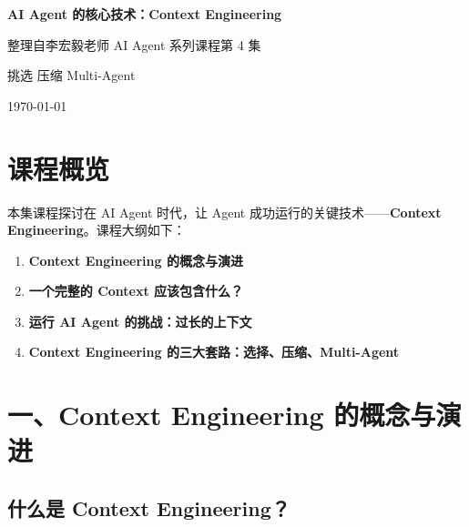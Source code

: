\documentclass[12pt,a4paper]{article}
\begin{document}
\begin{titlepage}
  \centering
  \vspace*{3cm}
  {\Huge\bfseries\sffamily AI Agent 的核心技术：Context Engineering\par}
  \vspace{1.5cm}
  {\Large 整理自李宏毅老师 AI Agent 系列课程第 4 集\par}
  \vspace{2cm}
  {\large\sffamily 挑选 \textbullet{} 压缩 \textbullet{} Multi-Agent\par}
  \vfill
  {\large \today\par}
\end{titlepage}

\newpage
\tableofcontents
\newpage

\section{课程概览}

本集课程探讨在 AI Agent 时代，让 Agent 成功运行的关键技术——\textbf{Context Engineering}。课程大纲如下：

\begin{enumerate}[leftmargin=2em]
  \item \textbf{Context Engineering 的概念与演进}
  \item \textbf{一个完整的 Context 应该包含什么？}
  \item \textbf{运行 AI Agent 的挑战：过长的上下文}
  \item \textbf{Context Engineering 的三大套路：选择、压缩、Multi-Agent}
\end{enumerate}

\section{一、Context Engineering 的概念与演进}

\subsection{什么是 Context Engineering？}
\end{document}
